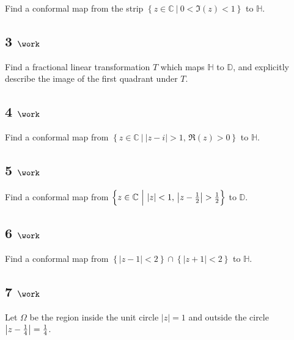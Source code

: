 Find a conformal map from the strip
\(\left\{{z\in {\mathbb{C}}{~\mathrel{\Big|}~}0 < \Im(z) < 1}\right\}\)
to \({\mathbb{H}}\).

\hypertarget{work-38}{%
\subsection{\texorpdfstring{3
\(\work\)}{3 \textbackslash work}}\label{work-38}}

Find a fractional linear transformation \(T\) which maps
\({\mathbb{H}}\) to \({\mathbb{D}}\), and explicitly describe the image
of the first quadrant under \(T\).

\hypertarget{work-39}{%
\subsection{\texorpdfstring{4
\(\work\)}{4 \textbackslash work}}\label{work-39}}

Find a conformal map from
\(\left\{{z\in {\mathbb{C}}{~\mathrel{\Big|}~}{\left\lvert {z-i} \right\rvert} > 1,\, \Re(z) > 0}\right\}\)
to \({\mathbb{H}}\).

\hypertarget{work-40}{%
\subsection{\texorpdfstring{5
\(\work\)}{5 \textbackslash work}}\label{work-40}}

Find a conformal map from
\(\left\{{z\in {\mathbb{C}}{~\mathrel{\Big|}~}{\left\lvert {z} \right\rvert} < 1,\, {\left\lvert {z - {1\over 2}} \right\rvert} > {1\over 2} }\right\}\)
to \({\mathbb{D}}\).

\hypertarget{work-41}{%
\subsection{\texorpdfstring{6
\(\work\)}{6 \textbackslash work}}\label{work-41}}

Find a conformal map from
\(\left\{{{\left\lvert {z-1} \right\rvert} < 2}\right\} \cap\left\{{{\left\lvert {z+1} \right\rvert} < 2}\right\}\)
to \({\mathbb{H}}\).

\hypertarget{work-42}{%
\subsection{\texorpdfstring{7
\(\work\)}{7 \textbackslash work}}\label{work-42}}

Let \(\Omega\) be the region inside the unit circle
\({\left\lvert {z} \right\rvert} = 1\) and outside the circle
\({\left\lvert {z-{1\over 4}} \right\rvert} = {1\over 4}\).

